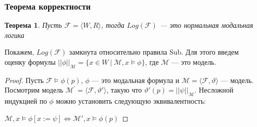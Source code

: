 \documentclass[pdf,utf8,russian,aspectratio=169]{beamer}
\newtheorem{theor}{Теорема}
\begin{document}
\begin{frame}
  \frametitle{Теорема корректности}

  \begin{theor}
    Пусть $\mathcal{F} = \langle W, R \rangle$, тогда $Log(\mathcal{F})$ --- это нормальная модальная логика
  \end{theor}

Покажем, $Log(\mathcal{F})$ замкнута относительно правила Sub. Для этого введем оценку формулы $|| \phi ||_{\mathcal{M}} = \{ x \in W \: | \: \mathcal{M}, x \models \phi \}$, где $\mathcal{M}$ --- это модель.

\begin{proof}
  Пусть $\mathcal{F} \models \phi(p)$, $\phi$ --- это модальная формула и $\mathcal{M} = \langle \mathcal{F}, \vartheta \rangle$ --- модель.
  Посмотрим модель $\mathcal{M}^{'} = \langle \mathcal{F}, \vartheta' \rangle$, такую что $\vartheta'(p) = ||\psi||_{\mathcal{M}}$. Несложной индукцией по $\phi$ можно установить следующую эквивалентность:

    $\mathcal{M}, x \models \phi [x := \psi] \Leftrightarrow \mathcal{M}', x \models \phi(p)$
\end{proof}
\end{frame}
\end{document}
